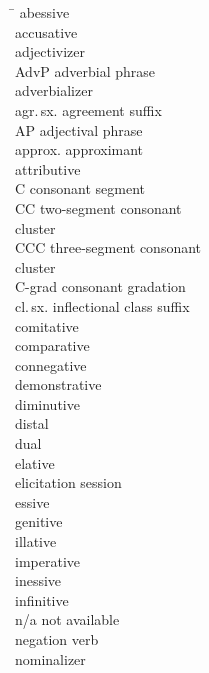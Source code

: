 \begin{multicols}{2}
\label{abbreviations}
\begin{tabbing}
\TABh \= \kill
{}	\> abessive \\
	\> accusative \\
	\> adjectivizer \\
AdvP	\>adverbial phrase\\
	\> adverbializer \\
agr.\,sx.	\> agreement suffix \\
AP		\>adjectival phrase\\
approx.	\>approximant\\
 	\> attributive\\
C		\>consonant segment\\
CC		\>two-segment consonant \\\> cluster\\
CCC		\>three-segment consonant \\\> cluster\\
C-grad	\> consonant gradation \\
cl.\,sx.	\> inflectional class suffix \\
	\> comitative \\
	\> comparative \\
\> connegative \\
	\> demonstrative\\
	\> diminutive \\
	\> distal \\
	\> dual \\
	\> elative \\
		\> elicitation session \\
	\> essive \\
	\> genitive \\
	\> illative \\
	\> imperative \\
	\> inessive \\
	\> infinitive \\
n/a	\> not available \\
	\> negation verb \\
	\> nominalizer \\

\end{tabbing}
\end{multicols}
